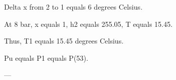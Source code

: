 Delta x from 2 to 1 equals 6 degrees Celsius.  

At 8 bar, x equals 1, h2 equals 255.05, T equals 15.45.  

Thus, T1 equals 15.45 degrees Celsius.  

Pu equals P1 equals P(53).  

---